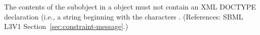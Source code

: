 The contents of the \Message subobject in a \Constraint object must not
contain an XML DOCTYPE declaration (i.e., a string beginning with the
characters .  (References: SBML L3V1
Section~\ref{sec:constraint-message}.)
